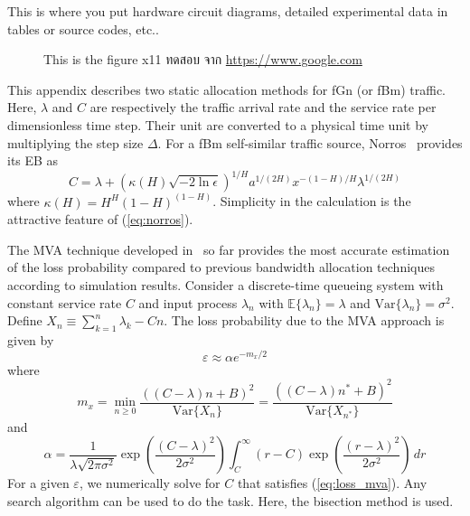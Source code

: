 \documentclass[12pt,oneside,openright,a4paper]{cpe-thai-project}
\begin{document}
This is where you put hardware circuit diagrams, detailed experimental data in tables or source codes, etc.. \\ \bigskip


\begin{figure}[!h]
    \caption{This is the figure x11 ทดสอบ จาก \href{https://www.google.com} {https://www.google.com}}\label{fig:x1}
\end{figure}


This appendix describes two static allocation methods for fGn (or fBm)
traffic. Here, $\lambda$ and $C$ are respectively the traffic arrival
rate and the service rate per dimensionless time step. Their unit are
converted to a physical time unit by multiplying the step size
$\Delta$. For a fBm self-similar traffic source,
Norros~\cite{norros95} provides its EB as
\begin{equation}\label{eq:norros}
    C = \lambda + (\kappa(H)\sqrt{-2\ln\epsilon})^{1/H}a^{1/(2H)}x^{-(1-H)/H}\lambda^{1/(2H)}
\end{equation}
where $\kappa(H) = H^H(1-H)^{(1-H)}$. Simplicity in the calculation is
the attractive feature of (\ref{eq:norros}).

The MVA technique developed in~\cite{kim01} so far provides the most
accurate estimation of the loss probability compared to previous
bandwidth allocation techniques according to simulation results.
Consider a discrete-time queueing system with constant service rate
$C$ and input process $\lambda_n$ with $\mathbb{E}\{\lambda_n\} =
    \lambda$ and $\mathrm{Var}\{\lambda_n\} = \sigma^2$.  Define $X_n \equiv
    \sum_{k=1}^n \lambda_k - Cn$.  The loss probability due to the MVA
approach is given by
\begin{equation}\label{eq:loss_mva}
    \varepsilon \approx \alpha e^{-m_x/2}
\end{equation}
where
\begin{equation}\label{eq:mx}
    m_x = \min_{n \geq 0} \frac{((C-\lambda)n + B)^2}{\mathrm{Var}\{X_n\}} =
    \frac{((C-\lambda)n^\ast + B)^2}{\mathrm{Var}\{X_{n^{\ast}}\}}
\end{equation}
and
\begin{equation}\label{eq:alpha}
    \alpha =
    \frac{1}{\lambda\sqrt{2\pi\sigma^2}}\exp\left(\frac{(C-\lambda)^2}{2\sigma^2}\right)
    \int_C^\infty (r-C)\exp\left(\frac{(r-\lambda)^2}{2\sigma^2}\right)\, dr
\end{equation}
For a given $\varepsilon$, we numerically solve for $C$ that satisfies
(\ref{eq:loss_mva}). Any search algorithm can be used to do the task.
Here, the bisection method is used.
\end{document}
